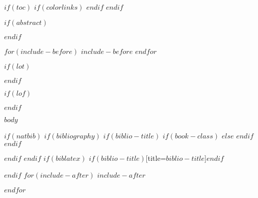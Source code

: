 \documentclass[$if(fontsize)$$fontsize$,$endif$$if(lang)$$babel-lang$,$endif$$if(papersize)$$papersize$paper,$endif$$for(classoption)$$classoption$$sep$,$endfor$]{$documentclass$}
\begin{document}
$if(toc)$
{
  $if(colorlinks)$
  \hypersetup{linkcolor=$if(toccolor)$$toccolor$$else$black$endif$}
  $endif$
  \setcounter{tocdepth}{$toc-depth$}
  \tableofcontents
  \pagebreak
}
$endif$

$if(abstract)$
  \begin{abstract}
    $abstract$
  \end{abstract}
$endif$

$for(include-before)$
$include-before$
$endfor$

$if(lot)$
  \listoftables
$endif$

$if(lof)$
  \listoffigures
$endif$

$body$

$if(natbib)$
$if(bibliography)$
$if(biblio-title)$
$if(book-class)$
\renewcommand\bibname{$biblio-title$}
$else$
\renewcommand\refname{$biblio-title$}
$endif$
$endif$


$endif$
$endif$
$if(biblatex)$
\printbibliography$if(biblio-title)$[title=$biblio-title$]$endif$

$endif$
$for(include-after)$
$include-after$

$endfor$
\end{document}
